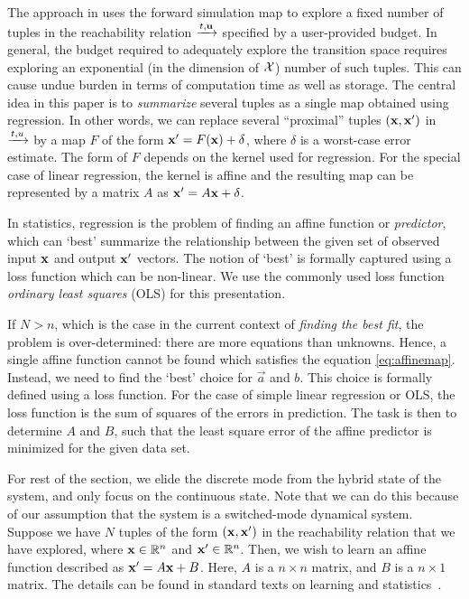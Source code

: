 The approach in \cite{zutshi2014multiple} uses the forward simulation
map to explore a fixed number of tuples in the reachability relation
$\xrightarrow{t,\mathbf{u}}$ specified by a user-provided budget.  In general, the
budget required to adequately explore the transition space requires
exploring an exponential (in the dimension of $\mathcal{X}$) number
of such tuples. This can cause undue burden in terms of computation
time as well as storage.  The central idea in this paper is to {\em
summarize} several tuples as a single map obtained using regression.
In other words, we can replace several ``proximal'' tuples
$(\mathbf{x},\mathbf{x}')$ in $\xrightarrow{t,u}$ by a map $F$ of the form $\mathbf{x}' = F(\mathbf{x})
+ \delta$, where $\delta$ is a worst-case error estimate. The form of
$F$ depends on the kernel used for regression. For the special case of
linear regression, the kernel is affine and the resulting map can be
represented by a matrix $A$ as $\mathbf{x}' = A\mathbf{x} + \delta$.

In statistics, regression is the problem of finding an affine
function or \textit{predictor}, which can `best' summarize the
relationship between the given set of observed input $\mathbf{x}$ and output
$\mathbf{x}'$ vectors. The notion of `best' is formally captured using a loss
function which can be non-linear. We use the commonly used loss
function \textit{ordinary least squares} (OLS) for this presentation.

If $N>n$, which is the case in the current context of \textit{finding
the best fit}, the problem is over-determined: there are more
equations than unknowns. Hence, a single affine function cannot be
found which satisfies the equation \eqref{eq:affinemap}. Instead, we
need to find the `best' choice for $\vec{a}$ and $b$. This choice is
formally defined using a loss function. For the case of simple linear
regression or OLS, the loss function is the sum of squares of the
errors in prediction.  The task is then to determine $A$ and $B$, such
that the least square error of the affine predictor is minimized for
the given data set.


For rest of the section, we elide the discrete mode from the hybrid
state of the system, and only focus on the continuous state. Note that
we can do this because of our assumption that the system is a
switched-mode dynamical system.  Suppose we have $N$ tuples of the
form $(\mathbf{x},\mathbf{x}')$ in the reachability relation that we have explored,
where $\mathbf{x}\in\mathbb{R}^n$ and $\mathbf{x}'\in\mathbb{R}^n$. Then, we wish to learn an
affine function described as $\mathbf{x}' = A\mathbf{x} + B$.
Here, $A$ is a $n\times n$ matrix, and $B$ is a $n\times 1$ matrix.
The details can be found in standard texts on learning and
statistics~\cite{friedman2001elements}.

